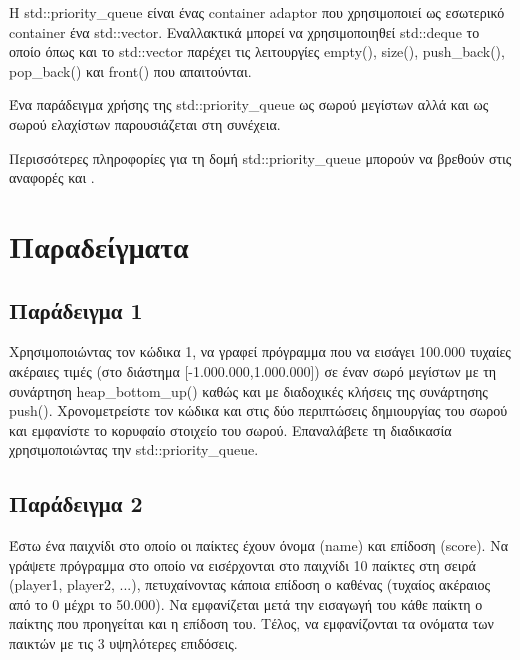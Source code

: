 H std::priority\_queue είναι ένας container adaptor που χρησιμοποιεί ως εσωτερικό container ένα std::vector. Εναλλακτικά μπορεί να χρησιμοποιηθεί std::deque το οποίο όπως και το std::vector παρέχει τις λειτουργίες empty(), size(), push\_back(), pop\_back() και front() που απαιτούνται. 

Ένα παράδειγμα χρήσης της std::priority\_queue ως σωρού μεγίστων αλλά και ως σωρού ελαχίστων παρουσιάζεται στη συνέχεια.





Περισσότερες πληροφορίες για τη δομή std::priority\_queue μπορούν να βρεθούν στις αναφορές \cite{g4g_priority_queue} και \cite{cppref_priority_queue}.


\section{Παραδείγματα}
\subsection{Παράδειγμα 1}
Χρησιμοποιώντας τον κώδικα 1, να γραφεί πρόγραμμα που να εισάγει 100.000 τυχαίες ακέραιες τιμές (στο διάστημα [-1.000.000,1.000.000]) σε έναν σωρό μεγίστων με τη συνάρτηση heap\_bottom\_up() καθώς και με διαδοχικές κλήσεις της συνάρτησης push(). Χρονομετρείστε τον κώδικα και στις δύο περιπτώσεις δημιουργίας του σωρού και εμφανίστε το κορυφαίο στοιχείο του σωρού. Επαναλάβετε τη διαδικασία χρησιμοποιώντας την std::priority\_queue.





\subsection{Παράδειγμα 2}
Έστω ένα παιχνίδι στο οποίο οι παίκτες έχουν όνομα (name) και επίδοση (score). Να γράψετε πρόγραμμα στο οποίο να εισέρχονται στο παιχνίδι 10 παίκτες στη σειρά (player1, player2, ...), πετυχαίνοντας κάποια επίδοση ο καθένας (τυχαίος ακέραιος από το 0 μέχρι το 50.000). Να εμφανίζεται μετά την εισαγωγή του κάθε παίκτη ο παίκτης που προηγείται και η επίδοση του. Τέλος, να εμφανίζονται τα ονόματα των παικτών με τις 3 υψηλότερες επιδόσεις.

